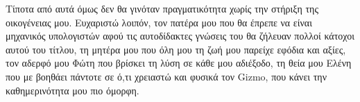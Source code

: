 \begin{mdseries}
Τίποτα από αυτά όμως δεν θα γινόταν πραγματικότητα χωρίς την στήριξη της οικογένειας μου. Ευχαριστώ λοιπόν, τον πατέρα μου που θα έπρεπε να είναι μηχανικός υπολογιστών αφού τις αυτοδίδακτες γνώσεις του θα ζήλευαν πολλοί κάτοχοι αυτού του τίτλου, τη μητέρα μου που όλη μου τη ζωή μου παρείχε εφόδια και αξίες, τον αδερφό μου Φώτη που βρίσκει τη λύση σε κάθε μου αδιέξοδο, τη θεία μου Ελένη που με βοηθάει πάντοτε σε ό,τι χρειαστώ και φυσικά τον \en Gizmo\gr{}, που κάνει την καθημερινότητα μου πιο όμορφη.
\end{mdseries}
\endgroup
\en
